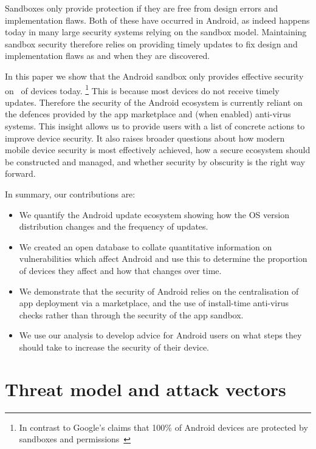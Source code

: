\documentclass{llncs}
\begin{document}
Sandboxes only provide protection if they are free from design errors and implementation flaws. 
Both of these have occurred in Android, as indeed happens today in many large security systems relying on the sandbox model. 
Maintaining sandbox security therefore relies on providing timely updates to fix design and implementation flaws as and when they are discovered.

In this paper we show that the Android sandbox only provides effective security on \daMeanSecurityPercTwosfNominal\ of devices today.
\footnote{In contrast to Google's claims that 100\% of Android devices are protected by sandboxes and permissions~\cite{Patterson2013}}
This is because most devices do not receive timely updates. 
Therefore the security of the Android ecosystem is currently reliant on the defences provided by the app marketplace and (when enabled) anti-virus systems. 
This insight allows us to provide users with a list of concrete actions to improve device security. 
It also raises broader questions about how modern mobile device security is most effectively achieved, how a secure ecosystem should be constructed and managed, and whether security by obscurity is the right way forward.

In summary, our contributions are:
\begin{itemize}
 \item We quantify the Android update ecosystem showing how the OS version distribution changes and the frequency of updates.
 \item We created an open database to collate quantitative information on vulnerabilities which affect Android and use this to determine the proportion of devices they affect and how that changes over time.
 \item We demonstrate that the security of Android relies on the centralisation of app deployment via a marketplace, and the use of install-time anti-virus checks rather than through the security of the app sandbox.
 \item We use our analysis to develop advice for Android users on what steps they should take to increase the security of their device.
 
\end{itemize}

\section{Threat model and attack vectors}
\label{sec:threatmodel}
\end{document}
